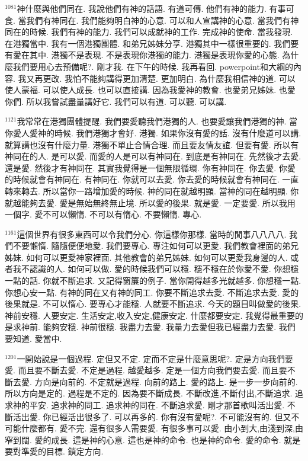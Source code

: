 \documentclass{book}
\begin{document}
$^{1081}$神什麼與他們同在.
我說他們有神的話語.
有道可傳.
他們有神的能力.
有事可食.
當我們有神同在.
我們能夠明白神的心意.
可以和人宣講神的心意.
當我們有神同在的時候.
我們有神的能力.
我們可以成就神的工作.
完成神的使命.
當我發現.
在港獨當中.
我有一個港獨團體.
和弟兄姊妹分享.
港獨其中一樣很重要的.
我們要有愛在其中.
港獨不是表現.
不是表現你港獨的能力.
港獨是表現你愛的心態.
為什麼我們要用心去預備呢?.
剛才我.
在下午的時候.
我再看回.
powerpoint和大綱的內容.
我又再更改.
我怕不能夠講得更加清楚.
更加明白.
為什麼我相信神的道.
可以使人蒙福.
可以使人成長.
也可以直接講.
因為我愛神的教會.
也愛弟兄姊妹.
也愛你們.
所以我嘗試盡量講好它.
我們可以有道.
可以聽.
可以講.

$^{1121}$我常常在港獨團體提醒.
我們要愛聽我們港獨的人.
也要愛讓我們港獨的神.
當你愛人愛神的時候.
我們港獨才會好.
港獨.
如果你沒有愛的話.
沒有什麼道可以講.
就算講也沒有什麼力量.
港獨不單止合情合理.
而且要友情友誼.
但要有愛.
所以有神同在的人.
是可以愛.
而愛的人是可以有神同在.
到底是有神同在.
先然後才去愛.
還是愛.
然後才有神同在.
其實我覺得是一個無限循環.
你有神同在.
你去愛.
你愛的時候就會有神同在.
有神同在.
你就可以去愛.
你去愛的時候就會有神同在.
一直轉來轉去.
所以當你一路增加愛的時候.
神的同在就越明顯.
當神的同在越明顯.
你就越能夠去愛.
愛是無始無終無止境.
所以愛的後果.
就是愛.
一定要愛.
所以我用一個字.
愛不可以懶惰.
不可以有惰心.
不要懶惰.
專心.

$^{1161}$這個世界有很多東西可以令我們分心.
你這樣你那樣.
當時的閒事八八八八.
我們不要懶惰.
隨隨便便地愛.
我們要專心.
專注如何可以更愛.
我們教會裡面的弟兄姊妹.
如何可以更愛神家裡面.
其他教會的弟兄姊妹.
如何可以更愛我身邊的人.
或者我不認識的人.
如何可以做.
愛的時候我們可以穩.
穩不穩在於你愛不愛.
你想穩一點的話.
你就不斷追求.
又記得窗簾的例子.
當你開得越多光就越多.
你想穩一點.
你想心安一點.
有神的同在又有神的同工.
你要不斷追求去愛.
不斷追求去愛.
愛的後果就是.
不可以惰心.
要專心才能穩.
人就要不斷追求.
今天的題目叫做愛的後果.
神前安穩.
人要安定.
生活安定,收入安定,健康安定.
什麼都要安定.
我覺得最重要的是求神前.
能夠安穩.
神前很穩.
我盡力去愛.
我量力去愛但我已經盡力去愛.
我們要知道.
愛當中.

$^{1201}$一開始說是一個過程.
定但又不定.
定而不定是什麼意思呢?.
定是方向我們要愛.
而且要不斷去愛.
不定是過程.
越愛越多.
定是一個方向我們要去愛.
而且要不斷去愛.
方向是向前的.
不定就是過程.
向前的路上.
愛的路上.
是一步一步向前的.
所以方向是定的.
過程是不定的.
因為要不斷成長.
不斷改進,不斷付出,不斷追求.
追求神的平安.
追求神的同工.
追求神的同在.
不斷追求愛.
剛才那首歌叫活出愛.
不斷活出愛.
你已經活出很多了.
可以再多的.
你有沒有愛呢?.
不可能沒有的.
但又不可能什麼都有.
愛不完.
還有很多人需要愛.
有很多事可以愛.
由小到大,由淺到深,由窄到闊.
愛的成長.
這是神的心意.
這也是神的命令.
也是神的命令.
愛的命令.
就是要對準愛的目標.
鎖定方向.
\end{document}
